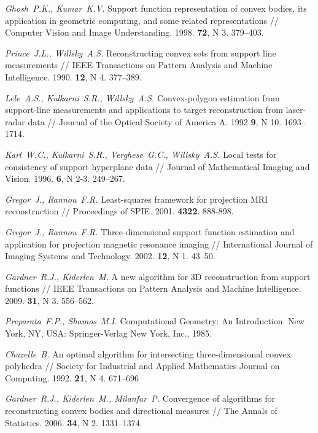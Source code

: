 \documentclass[a4paper, 10pt]{article}
\theoremstyle{definition}
\theoremstyle{plain}
\theoremstyle{plain}
\begin{document}
%
\begin{thebibliography}{50}

\emph{Ghosh~P.K., Kumar~K.V.}
Support function representation of convex bodies, its
application in geometric computing, and some related representations //
Computer Vision and Image Understanding.
1998.
\textbf{72},
N 3.
379--403.

\emph{Prince~J.L., Willsky~A.S.}
Reconstructing convex sets from support line measurements //
IEEE Transactions on Pattern Analysis and Machine Intelligence.
1990.
\textbf{12},
N 4.
377--389.

\emph{Lele~A.S., Kulkarni~S.R., Willsky~A.S.}
Convex-polygon estimation from support-line measurements and applications to
target reconstruction from laser-radar data //
Journal of the Optical Society of America A.
1992
\textbf{9},
N 10.
1693--1714.

\emph{Karl~W.C., Kulkarni~S.R., Verghese~G.C., Willsky~A.S.}
Local tests for consistency of support hyperplane data //
Journal of Mathematical Imaging and Vision.
1996.
\textbf{6},
N 2-3.
249--267.

\emph{Gregor~J., Rannou~F.R.}
Least-squares framework for projection {MRI} reconstruction //
Proceedings of SPIE.
2001.
\textbf{4322}.
888-898.

\emph{Gregor~J., Rannou~F.R.}
Three-dimensional support function estimation and application for projection
magnetic resonance imaging //
International Journal of Imaging Systems and Technology.
2002.
\textbf{12},
N 1.
43--50.

\emph{Gardner~R.J., Kiderlen~M.}
A new algorithm for 3D reconstruction from support functions //
IEEE Transactions on Pattern Analysis and Machine Intelligence.
2009.
\textbf{31},
N 3.
556--562.

\emph{Preparata~F.P., Shamos~M.I.}
Computational Geometry:  An Introduction.
New York, NY, USA:
Springer-Verlag New York, Inc.,
1985.

\emph{Chazelle~B.}
An optimal algorithm for intersecting three-dimensional convex polyhedra //
Society for Industrial and Applied Mathematics Journal on Computing.
1992.
\textbf{21},
N 4.
671--696

\emph{Gardner~R.J., Kiderlen~M., Milanfar~P.}
Convergence of algorithms for reconstructing convex bodies and directional
measures //
The Annals of Statistics.
2006.
\textbf{34},
N 2.
1331--1374.


\end{thebibliography}
\end{document}
